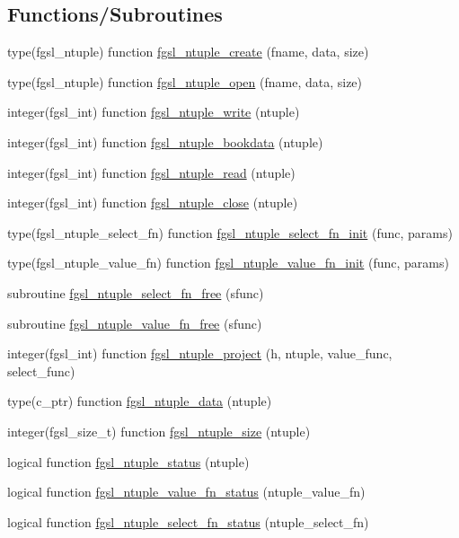 \subsection*{Functions/\+Subroutines}
\begin{DoxyCompactItemize}
\item 
type(fgsl\+\_\+ntuple) function \hyperlink{ntuple_8finc_a53e8e8c2b59e9996577478079aec392a}{fgsl\+\_\+ntuple\+\_\+create} (fname, data, size)
\item 
type(fgsl\+\_\+ntuple) function \hyperlink{ntuple_8finc_a825ef23e9dc1d74ff1a263191c490bd0}{fgsl\+\_\+ntuple\+\_\+open} (fname, data, size)
\item 
integer(fgsl\+\_\+int) function \hyperlink{ntuple_8finc_a356af99564ad1459930057c34017e161}{fgsl\+\_\+ntuple\+\_\+write} (ntuple)
\item 
integer(fgsl\+\_\+int) function \hyperlink{ntuple_8finc_a88cfeaf087d36f1e4e6a0d81ac04bdb3}{fgsl\+\_\+ntuple\+\_\+bookdata} (ntuple)
\item 
integer(fgsl\+\_\+int) function \hyperlink{ntuple_8finc_a479c00a78c57f2b3b14cc9f12a514b6b}{fgsl\+\_\+ntuple\+\_\+read} (ntuple)
\item 
integer(fgsl\+\_\+int) function \hyperlink{ntuple_8finc_a1a996c87696028b62352cd43a82a6879}{fgsl\+\_\+ntuple\+\_\+close} (ntuple)
\item 
type(fgsl\+\_\+ntuple\+\_\+select\+\_\+fn) function \hyperlink{ntuple_8finc_aa04c4dfcb377f33a3a63fc7415cb3e3f}{fgsl\+\_\+ntuple\+\_\+select\+\_\+fn\+\_\+init} (func, params)
\item 
type(fgsl\+\_\+ntuple\+\_\+value\+\_\+fn) function \hyperlink{ntuple_8finc_a5672a466c45b2c1eaf5cf76209e6d282}{fgsl\+\_\+ntuple\+\_\+value\+\_\+fn\+\_\+init} (func, params)
\item 
subroutine \hyperlink{ntuple_8finc_ad8dde1fb48951e3df2ed85fdd4dbe928}{fgsl\+\_\+ntuple\+\_\+select\+\_\+fn\+\_\+free} (sfunc)
\item 
subroutine \hyperlink{ntuple_8finc_a79a22db8b1a4e150923981198b5c7aab}{fgsl\+\_\+ntuple\+\_\+value\+\_\+fn\+\_\+free} (sfunc)
\item 
integer(fgsl\+\_\+int) function \hyperlink{ntuple_8finc_ac2d58b11f74188b4b684a7e1bb701042}{fgsl\+\_\+ntuple\+\_\+project} (h, ntuple, value\+\_\+func, select\+\_\+func)
\item 
type(c\+\_\+ptr) function \hyperlink{ntuple_8finc_a6fd6e5da6139dffa2f6f61aa8aceafb1}{fgsl\+\_\+ntuple\+\_\+data} (ntuple)
\item 
integer(fgsl\+\_\+size\+\_\+t) function \hyperlink{ntuple_8finc_a4c85f3d692fd5e14aadd2ffd1ddd7c0a}{fgsl\+\_\+ntuple\+\_\+size} (ntuple)
\item 
logical function \hyperlink{ntuple_8finc_acb6eee4253ad2f01ea71e4c1c9392ed0}{fgsl\+\_\+ntuple\+\_\+status} (ntuple)
\item 
logical function \hyperlink{ntuple_8finc_a62c72f68341a457467ae7f0ceecf9911}{fgsl\+\_\+ntuple\+\_\+value\+\_\+fn\+\_\+status} (ntuple\+\_\+value\+\_\+fn)
\item 
logical function \hyperlink{ntuple_8finc_a7e638d180dad856d12938578ae718601}{fgsl\+\_\+ntuple\+\_\+select\+\_\+fn\+\_\+status} (ntuple\+\_\+select\+\_\+fn)
\end{DoxyCompactItemize}


